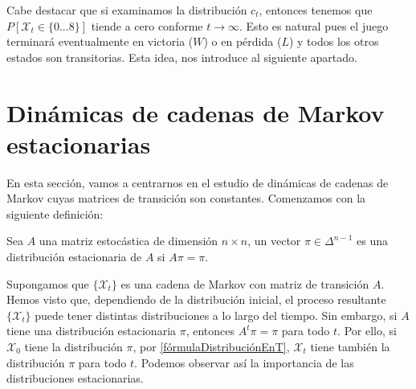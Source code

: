 \begin{exampleth}
Cabe destacar que si examinamos la distribución $c_t$, entonces tenemos que $P[\mathcal{X}_t\in\{0...8\}]$ tiende a cero conforme $t\rightarrow\infty$. Esto es natural pues el juego terminará eventualmente en victoria ($W$) o en pérdida ($L$) y todos los otros estados son transitorias. Esta idea, nos introduce al siguiente apartado.

\end{exampleth}

\section{Dinámicas de cadenas de Markov estacionarias}
En esta sección, vamos a centrarnos en el estudio de dinámicas de cadenas de Markov cuyas matrices de transición son constantes. Comenzamos con la siguiente definición:
\begin{definition}
Sea $A$ una matriz estocástica de dimensión $n\times n$, un vector $\pi\in\Delta^{n-1}$ es una distribución estacionaria de $A$ si $A\pi=\pi$.
\end{definition}

Supongamos que $\{\mathcal{X}_t\}$ es una cadena de Markov con matriz de transición $A$. Hemos visto que, dependiendo de la distribución inicial, el proceso resultante $\{\mathcal{X}_t\}$ puede tener distintas distribuciones a lo largo del tiempo. Sin embargo, si $A$ tiene una distribución estacionaria $\pi$, entonces $A^t\pi=\pi$ para todo $t$. Por ello, si $\mathcal{X}_0$ tiene la distribución $\pi$, por \ref{fórmulaDistribuciónEnT}, $\mathcal{X}_t$ tiene también la distribución $\pi$ para todo $t$. Podemos observar así la importancia de las distribuciones estacionarias.